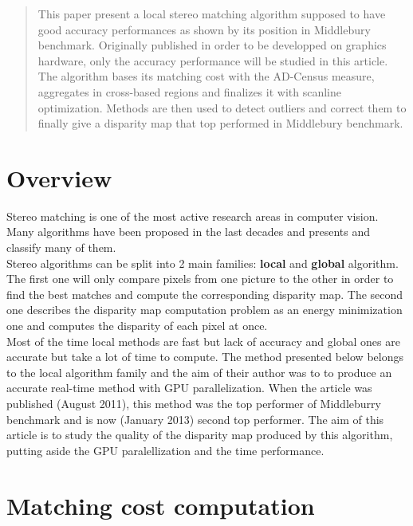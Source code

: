 \documentclass{ipol}
\begin{document}
\begin{abstract}
This paper present a local stereo matching algorithm supposed to have good accuracy performances as shown by its position in Middlebury benchmark. Originally published in order to be developped on graphics hardware, only the accuracy performance will be studied in this article. The algorithm bases its matching cost with the AD-Census measure, aggregates in cross-based regions and finalizes it with scanline optimization. Methods are then used to detect outliers and correct them to finally give a disparity map that top performed in Middlebury benchmark.
\end{abstract} 

\section{Overview}

Stereo matching is one of the most active research areas in computer vision. Many algorithms have been proposed in the last decades and  \cite{stereoTaxonomy} presents and classify many of them.\\
Stereo algorithms can be split into 2 main families: \textbf{local} and \textbf{global} algorithm. The first one will only compare pixels from one picture to the other in order to find the best matches and compute the corresponding disparity map. The second one describes the disparity map computation problem as an energy minimization one and computes the disparity of each pixel at once.\\
Most of the time local methods are fast but lack of accuracy and global ones are accurate but take a lot of time to compute. The method \cite{adCensus}  presented below belongs to the local algorithm family and the aim of their author was to to produce an accurate real-time method with GPU parallelization. When the article was published (August 2011), this method was the top performer of Middleburry benchmark \cite{middleBench} and is now (January 2013) second top performer. The aim of this article is to study the quality of the disparity map produced by this algorithm, putting aside the GPU paralellization and the time performance.

\section{Matching cost computation}
\end{document}
